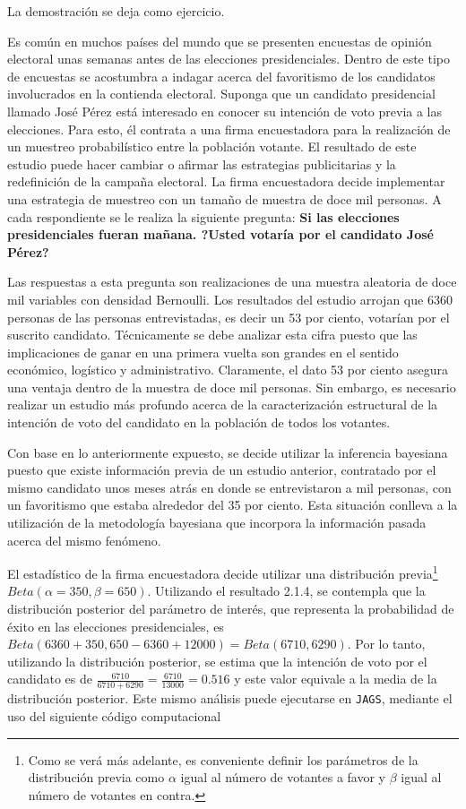     La demostraci\'on se deja como ejercicio.
    
    \begin{Eje}
    Es com\'un en muchos pa\'ises del mundo que se presenten encuestas de opini\'on electoral unas semanas antes de las elecciones presidenciales. Dentro de este tipo de encuestas se acostumbra a indagar acerca del favoritismo de los candidatos involucrados en la contienda electoral. Suponga que un candidato presidencial llamado Jos\'e P\'erez est\'a interesado en conocer su intenci\'on de voto previa a las elecciones. Para esto, \'el contrata a una firma encuestadora para la realizaci\'on de un muestreo probabil\'istico entre la poblaci\'on votante. El resultado de este estudio puede hacer cambiar o afirmar las estrategias publicitarias y la redefinici\'on de la campa\~na electoral. La firma encuestadora decide implementar una estrategia de muestreo con un tama\~no de muestra de doce mil personas. A cada respondiente se le realiza la siguiente pregunta: \textbf{Si las elecciones presidenciales fueran ma\~nana. ?Usted votar\'ia por el candidato Jos\'e P\'erez?}
    
    Las respuestas a esta pregunta son realizaciones de una muestra aleatoria de doce mil variables con densidad Bernoulli. Los resultados del estudio arrojan que 6360 personas de las personas entrevistadas, es decir un 53 por ciento, votar\'ian por el suscrito candidato. T\'ecnicamente se debe analizar esta cifra puesto que las implicaciones de ganar en una primera vuelta son grandes en el sentido econ\'omico, log\'istico y administrativo. Claramente, el dato 53 por ciento asegura una ventaja dentro de la muestra de doce mil personas. Sin embargo, es necesario realizar un estudio m\'as profundo acerca de la caracterizaci\'on estructural de la intenci\'on de voto del candidato en la poblaci\'on de todos los votantes.
    
    Con base en lo anteriormente expuesto, se decide utilizar la inferencia bayesiana puesto que existe informaci\'on previa de un estudio anterior, contratado por el mismo candidato unos meses atr\'as en donde se entrevistaron a mil personas, con un favoritismo que estaba alrededor del 35 por ciento. Esta situaci\'on conlleva a la utilizaci\'on de la metodolog\'ia bayesiana que incorpora la informaci\'on pasada acerca del mismo fen\'omeno.
    
    El estad\'istico de la firma encuestadora decide utilizar una distribuci\'on previa\footnote{Como se ver\'a m\'as adelante, es conveniente definir los par\'ametros de la distribuci\'on previa como $\alpha$ igual al n\'umero de votantes a favor y $\beta$ igual al n\'umero de votantes en contra.} $Beta(\alpha=350, \beta=650)$. Utilizando el resultado 2.1.4, se contempla que la distribuci\'on posterior del par\'ametro de inter\'es, que representa la probabilidad de \'exito en las elecciones presidenciales, es $Beta(6360+350, 650-6360+12000)=Beta(6710, 6290)$. Por lo tanto, utilizando la distribuci\'on posterior, se estima que la intenci\'on de voto por el candidato es de $\frac{6710}{6710+6290}=\frac{6710}{13000}=0.516$ y este valor equivale a la media de la distribuci\'on posterior. Este mismo an\'alisis puede ejecutarse en \texttt{JAGS}, mediante el uso del siguiente c\'odigo computacional
    

\end{Eje}
